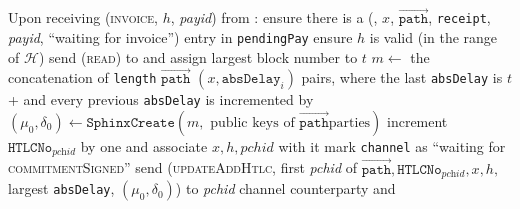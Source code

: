 \begin{algorithmic}[1]
    \State Upon receiving (\textsc{invoice}, $h$, \textit{payid}) from \bob:
    \Indent
      \State ensure there is a (\bob, $x$, $\overrightarrow{\mathtt{path}}$,
      \texttt{receipt}, \textit{payid}, ``waiting for invoice'') entry in
      \texttt{pendingPay}
      \State ensure $h$ is valid (in the range of $\mathcal{H}$)
      \State send (\textsc{read}) to \ledger{} and assign largest block number
      to $t$
      \State $m \gets$ the concatenation of \texttt{length}
      $\overrightarrow{\mathtt{path}}$ $\left(x, \mathtt{absDelay}_i\right)$
      pairs, where the last \texttt{absDelay} is $t$ +  and
      every previous \texttt{absDelay} is incremented by 
      \State $\left(\mu_0, \delta_0\right) \gets \mathtt{SphinxCreate}\left(m,
      \text{ public keys of } \overrightarrow{\mathtt{path}} \text{
      parties}\right)$
      \State increment $\mathtt{HTLCNo}_{\textit{pchid}}$ by one and associate
      $x, h, \mathit{pchid}$ with it
      \State mark \texttt{channel} as ``waiting for \textsc{commitmentSigned}''
      \State send (\textsc{updateAddHtlc}, first \textit{pchid} of
      $\overrightarrow{\mathtt{path}}, \mathtt{HTLCNo}_{\textit{pchid}}, x, h,$
      largest \texttt{absDelay}, $\left(\mu_0, \delta_0\right)$) to
      \textit{pchid} channel counterparty and \adversary
    \EndIndent
    \State


\end{algorithmic}
